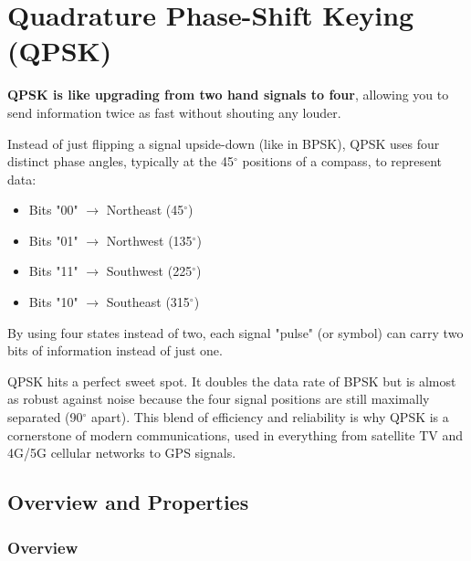 
\chapter{Quadrature Phase-Shift Keying (QPSK)}
\label{ch:qpsk}

\begin{nontechnical}
    \textbf{QPSK is like upgrading from two hand signals to four}, allowing you to send information twice as fast without shouting any louder.

     Instead of just flipping a signal upside-down (like in BPSK), QPSK uses four distinct phase angles, typically at the 45$^\circ$ positions of a compass, to represent data:
    \begin{itemize}
        \item Bits "00" $\rightarrow$ Northeast (45$^\circ$)
        \item Bits "01" $\rightarrow$ Northwest (135$^\circ$)
        \item Bits "11" $\rightarrow$ Southwest (225$^\circ$)
        \item Bits "10" $\rightarrow$ Southeast (315$^\circ$)
    \end{itemize}
    By using four states instead of two, each signal "pulse" (or symbol) can carry two bits of information instead of just one.

     QPSK hits a perfect sweet spot. It doubles the data rate of BPSK but is almost as robust against noise because the four signal positions are still maximally separated (90$^\circ$ apart). This blend of efficiency and reliability is why QPSK is a cornerstone of modern communications, used in everything from satellite TV and 4G/5G cellular networks to GPS signals.
\end{nontechnical}


\section{Overview and Properties}

\subsection{Overview}

